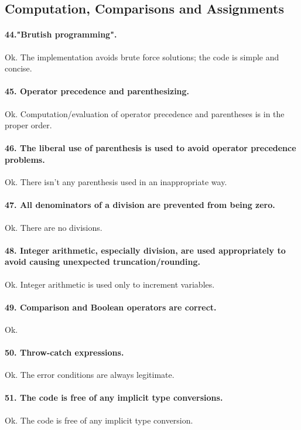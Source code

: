 \documentclass[english]{article}
\begin{document}
\subsection{Computation, Comparisons and Assignments}
\paragraph{44."Brutish programming".}
Ok. The implementation avoids brute force solutions; the code is simple and concise.

\paragraph{45. Operator precedence and parenthesizing.}
Ok. Computation/evaluation of operator precedence and parentheses is in the proper order.
 
\paragraph{46. The liberal use of parenthesis is used to avoid operator precedence problems.}
Ok. There isn't any parenthesis used in an inappropriate way.

\paragraph{47. All denominators of a division are prevented from being zero.}
Ok. There are no divisions.

\paragraph{48. Integer arithmetic, especially division, are used appropriately to avoid causing unexpected truncation/rounding.}
Ok. Integer arithmetic is used only to increment variables.

\paragraph{49. Comparison and Boolean operators are correct.}
Ok.

\paragraph{50. Throw-catch expressions.}
Ok. The error conditions are always legitimate.

\paragraph{51. The code is free of any implicit type conversions.}
Ok. The code is free of any implicit type conversion.
\end{document}
